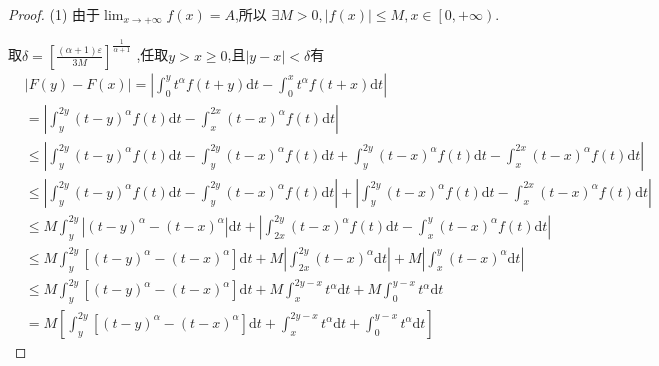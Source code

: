 \documentclass[lang=cn,newtx,10pt,scheme=chinese]{../Template/elegantbook}
\begin{document}
\begin{proof}
(1)
由于$\lim_{x\rightarrow +\infty} f\left( x \right) =A$,所以
$\exists M>0,\left| f\left( x \right) \right|\leqslant M,x\in \left[ 0,+\infty \right) $.

取$\delta =\left[ \frac{\left( \alpha +1 \right) \varepsilon}{3M} \right] ^{\frac{1}{\alpha +1}}$
,任取$y>x \geqslant 0$,且$\left| y-x \right|<\delta $有
\begin{align}
&\left| F\left( y \right) -F\left( x \right) \right|=\left| \int_0^y{t^{\alpha}}f\left( t+y \right) \mathrm{d}t-\int_0^x{t^{\alpha}}f\left( t+x \right) \mathrm{d}t \right| \nonumber
\\
&=\left| \int_y^{2y}{\left( t-y \right) ^{\alpha}}f\left( t \right) \mathrm{d}t-\int_x^{2x}{\left( t-x \right) ^{\alpha}}f\left( t \right) \mathrm{d}t \right| \nonumber
\\
&\leqslant \left| \int_y^{2y}{\left( t-y \right) ^{\alpha}}f\left( t \right) \mathrm{d}t-\int_y^{2y}{\left( t-x \right) ^{\alpha}}f\left( t \right) \mathrm{d}t+\int_y^{2y}{\left( t-x \right) ^{\alpha}}f\left( t \right) \mathrm{d}t-\int_x^{2x}{\left( t-x \right) ^{\alpha}}f\left( t \right) \mathrm{d}t \right| \nonumber
\\
&\leqslant \left| \int_y^{2y}{\left( t-y \right) ^{\alpha}}f\left( t \right) \mathrm{d}t-\int_y^{2y}{\left( t-x \right) ^{\alpha}}f\left( t \right) \mathrm{d}t \right|+\left| \int_y^{2y}{\left( t-x \right) ^{\alpha}}f\left( t \right) \mathrm{d}t-\int_x^{2x}{\left( t-x \right) ^{\alpha}}f\left( t \right) \mathrm{d}t \right| \nonumber
\\
&\leqslant M\int_y^{2y}{\left| \left( t-y \right) ^{\alpha}-\left( t-x \right) ^{\alpha} \right|}\mathrm{d}t+\left| \int_{2x}^{2y}{\left( t-x \right) ^{\alpha}}f\left( t \right) \mathrm{d}t-\int_x^y{\left( t-x \right) ^{\alpha}}f\left( t \right) \mathrm{d}t \right| \nonumber
\\
&\leqslant M\int_y^{2y}{\left[ \left( t-y \right) ^{\alpha}-\left( t-x \right) ^{\alpha} \right]}\mathrm{d}t+M\left| \int_{2x}^{2y}{\left( t-x \right) ^{\alpha}}\mathrm{d}t \right|+M\left| \int_x^y{\left( t-x \right) ^{\alpha}}\mathrm{d}t \right| \nonumber
\\
&\leqslant M\int_y^{2y}{\left[ \left( t-y \right) ^{\alpha}-\left( t-x \right) ^{\alpha} \right]}\mathrm{d}t+M\int_x^{2y-x}{t^{\alpha}}\mathrm{d}t+M\int_0^{y-x}{t^{\alpha}}\mathrm{d}t \nonumber
\\
&=M\left[ \int_y^{2y}{\left[ \left( t-y \right) ^{\alpha}-\left( t-x \right) ^{\alpha} \right]}\mathrm{d}t+\int_x^{2y-x}{t^{\alpha}}\mathrm{d}t+\int_0^{y-x}{t^{\alpha}}\mathrm{d}t \right]  \nonumber

\end{align}
\end{proof}
\end{document}
